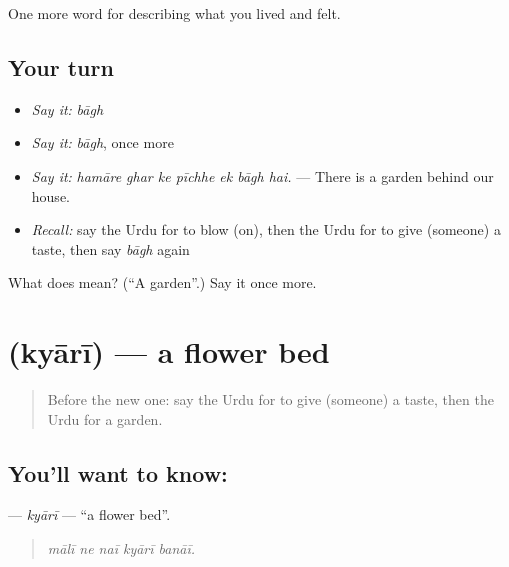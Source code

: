 \begin{grammarlens}[title={What you've built}]
One more word for describing what you lived and felt.
\end{grammarlens}

\subsection*{Your turn}
\begin{itemize}
\raggedright
  \item \emph{Say it:} \emph{bāgh}
  \item \emph{Say it:} \emph{bāgh}, once more
  \item \emph{Say it:} \emph{hamāre ghar ke pīchhe ek bāgh hai.} — There is a garden behind our house.
  \item \emph{Recall:} say the Urdu for to blow (on), then the Urdu for to give (someone) a taste, then say \emph{bāgh} again
\end{itemize}

\begin{tcolorbox}[breakable,colback=teal!4,colframe=teal!35!black,title={Before you move on}]
What does  mean? (\textquotedblleft{}A garden\textquotedblright{}.) Say it once more.
\end{tcolorbox}
\section[\texorpdfstring{\ur{کیاری} (kyārī)}{کیاری (kyārī)}]{ (kyārī) — a flower bed}

\label{lesson:UR-C512-kyari}



\begin{quote}
Before the new one: say the Urdu for to give (someone) a taste, then the Urdu for a garden.
\end{quote}

\subsection*{You'll want to know: }
\textbf{} — \emph{kyārī} — \textquotedblleft{}a flower bed\textquotedblright{}.

\begin{quote}
    
\end{quote}

\begin{quote}
\emph{mālī ne naī kyārī banāī.}
\end{quote}

